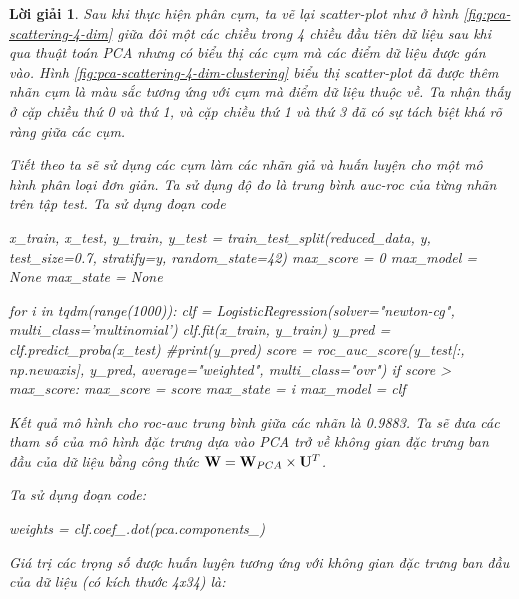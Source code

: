 \documentclass[14pt, a4paper]{article}
\theoremstyle{sltheorem}
\theoremstyle{soltheorem}
\newtheorem*{loigiai}{Lời giải}
\begin{document}
\begin{loigiai}
    Sau khi thực hiện phân cụm, ta vẽ lại scatter-plot như ở hình \ref{fig:pca-scattering-4-dim} giữa đôi một các chiều trong 4 chiều đầu tiên dữ liệu sau khi qua thuật toán PCA nhưng có biểu thị các cụm mà các điểm dữ liệu được gán vào.
    Hình \ref{fig:pca-scattering-4-dim-clustering} biểu thị scatter-plot đã được thêm nhãn cụm là màu sắc tương ứng với cụm mà điểm dữ liệu thuộc về.
    Ta nhận thấy ở cặp chiều thứ 0 và thứ 1, và cặp chiều thứ 1 và thứ 3 đã có sự tách biệt khá rõ ràng giữa các cụm.

    Tiết theo ta sẽ sử dụng các cụm làm các nhãn giả và huấn luyện cho một mô hình phân loại đơn giản.
    Ta sử dụng độ đo là trung bình auc-roc của từng nhãn trên tập test.
    Ta sử dụng đoạn code


    \begin{python}
x_train, x_test, y_train, y_test = train_test_split(reduced_data, y, test_size=0.7, stratify=y, random_state=42)
max_score = 0
max_model = None
max_state = None

for i in tqdm(range(1000)):
    clf = LogisticRegression(solver="newton-cg", multi_class='multinomial')
    clf.fit(x_train, y_train)
    y_pred = clf.predict_proba(x_test)
    #print(y_pred)
    score = roc_auc_score(y_test[:, np.newaxis], y_pred, average="weighted", multi_class="ovr")
    if score > max_score:
        max_score = score
        max_state = i
        max_model = clf
    \end{python}

    Kết quả mô hình cho roc-auc trung bình giữa các nhãn là 0.9883.
    Ta sẽ đưa các tham số của mô hình đặc trưng dựa vào PCA trở về không gian đặc trưng ban đầu của dữ liệu bằng công thức $\bold{W} =   \bold{W}_{PCA} \times \bold{U}^T$.

    Ta sử dụng đoạn code:


    \begin{python}
weights = clf.coef_.dot(pca.components_)
    \end{python}

    Giá trị các trọng số được huấn luyện tương ứng với không gian đặc trưng ban đầu của dữ liệu (có kích thước 4x34) là:


\end{loigiai}
\end{document}
